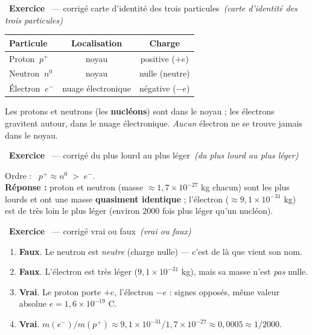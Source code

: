 \documentclass[11pt,a4paper]{article}
\newcommand{\pp}{p^{+}}
\newcommand{\ee}{e^{-}}
\newcommand{\nz}{n^{0}}
\newcommand{\rep}{\textbf{\color{excol}Réponse : }}
\newcounter{exo}
\newcommand{\cor}[1][]{\stepcounter{exo}\par\medskip%
  \noindent{\color{primary}\rule[-2pt]{3.5pt}{15pt}}\ \textbf{\color{primarydark}\large Exercice \theexo}%
  \ \textmd{\normalsize\color{black!55}— corrigé}%
  \ifx\relax#1\relax\relax\else\ \textmd{\normalsize\color{black!65}\itshape (#1)}\fi\par\nopagebreak\smallskip}
\begin{document}

\cor[carte d'identité des trois particules]
\begin{center}
\renewcommand{\arraystretch}{1.25}
\begin{tabular}{l c c}
\toprule
\rowcolor{primary!14}
\textbf{Particule} & \textbf{Localisation} & \textbf{Charge} \\
\midrule
Proton $\ \pp$   & noyau              & positive ($+e$) \\
Neutron $\ \nz$  & noyau              & nulle (neutre) \\
Électron $\ \ee$ & nuage électronique & négative ($-e$) \\
\bottomrule
\end{tabular}
\end{center}
Les protons et neutrons (les \textbf{nucléons}) sont dans le noyau ; les électrons gravitent autour, dans
le nuage électronique. \emph{Aucun} électron ne se trouve jamais dans le noyau.

\cor[du plus lourd au plus léger]
Ordre : \ $\pp \approx \nz \;>\; \ee$. \\
\rep proton et neutron (masse $\approx 1{,}7\times10^{-27}$ kg chacun) sont les plus lourds et ont une
masse \textbf{quasiment identique} ; l'électron ($\approx 9{,}1\times10^{-31}$ kg) est de très loin le
plus léger (environ $2000$ fois plus léger qu'un nucléon).

\cor[vrai ou faux]
\begin{enumerate}[label=\alph*)]
  \item \textbf{\color{attncol}Faux}. Le neutron est \emph{neutre} (charge nulle) — c'est de là que vient
        son nom.
  \item \textbf{\color{attncol}Faux}. L'électron est très léger ($9{,}1\times10^{-31}$ kg), mais sa masse
        n'est \emph{pas} nulle.
  \item \textbf{\color{excol}Vrai}. Le proton porte $+e$, l'électron $-e$ : signes opposés, même valeur
        absolue $e = 1{,}6\times10^{-19}$ C.
  \item \textbf{\color{excol}Vrai}. $m(\ee)/m(\pp)\approx 9{,}1\times10^{-31}/1{,}7\times10^{-27}\approx
        0{,}0005 \approx 1/2000$.
\end{enumerate}
\end{document}
